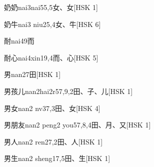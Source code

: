 \begin{EntryWithPhonetic}{奶奶}{nai3nai5}{5,5}{⼥、⼥}[HSK 1]
\end{EntryWithPhonetic}

\begin{EntryWithPhonetic}{奶牛}{nai3 niu2}{5,4}{⼥、⽜}[HSK 6]
\end{EntryWithPhonetic}

\begin{EntryWithPhonetic}{耐}{nai4}{9}{⽽}
\end{EntryWithPhonetic}

\begin{EntryWithPhonetic}{耐心}{nai4xin1}{9,4}{⽽、⼼}[HSK 5]
\end{EntryWithPhonetic}

\begin{EntryWithPhonetic}{男}{nan2}{7}{⽥}[HSK 1]
\end{EntryWithPhonetic}

\begin{EntryWithPhonetic}{男孩儿}{nan2hai2r5}{7,9,2}{⽥、⼦、⼉}[HSK 1]
\end{EntryWithPhonetic}

\begin{EntryWithPhonetic}{男女}{nan2 nv3}{7,3}{⽥、⼥}[HSK 4]
\end{EntryWithPhonetic}

\begin{EntryWithPhonetic}{男朋友}{nan2 peng2 you5}{7,8,4}{⽥、⽉、⼜}[HSK 1]
\end{EntryWithPhonetic}

\begin{EntryWithPhonetic}{男人}{nan2 ren2}{7,2}{⽥、⼈}[HSK 1]
\end{EntryWithPhonetic}

\begin{EntryWithPhonetic}{男生}{nan2 sheng1}{7,5}{⽥、⽣}[HSK 1]
\end{EntryWithPhonetic}

